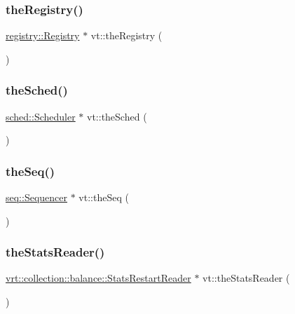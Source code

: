 \mbox{\label{namespacevt_a8b5994a5aedabc64006ce820db2e938c}} 
\subsubsection{\texorpdfstring{the\+Registry()}{theRegistry()}}
{\footnotesize\ttfamily \hyperlink{structvt_1_1registry_1_1_registry}{registry\+::\+Registry} $\ast$ vt\+::the\+Registry (\begin{DoxyParamCaption}{ }\end{DoxyParamCaption})}

\mbox{\label{namespacevt_a4508b38e6ab664b64f1415aecbb83571}} 
\subsubsection{\texorpdfstring{the\+Sched()}{theSched()}}
{\footnotesize\ttfamily \hyperlink{structvt_1_1sched_1_1_scheduler}{sched\+::\+Scheduler} $\ast$ vt\+::the\+Sched (\begin{DoxyParamCaption}{ }\end{DoxyParamCaption})}

\mbox{\label{namespacevt_a4a7d07c845b311da59286de486d623c7}} 
\subsubsection{\texorpdfstring{the\+Seq()}{theSeq()}}
{\footnotesize\ttfamily \hyperlink{structvt_1_1seq_1_1_sequencer}{seq\+::\+Sequencer} $\ast$ vt\+::the\+Seq (\begin{DoxyParamCaption}{ }\end{DoxyParamCaption})}

\mbox{\label{namespacevt_ad73860100c7d2ca1d833eab74942ee73}} 
\subsubsection{\texorpdfstring{the\+Stats\+Reader()}{theStatsReader()}}
{\footnotesize\ttfamily \hyperlink{structvt_1_1vrt_1_1collection_1_1balance_1_1_stats_restart_reader}{vrt\+::collection\+::balance\+::\+Stats\+Restart\+Reader} $\ast$ vt\+::the\+Stats\+Reader (\begin{DoxyParamCaption}{ }\end{DoxyParamCaption})}

